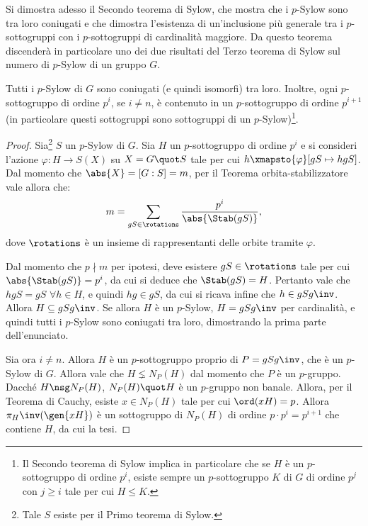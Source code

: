 \documentclass[12pt]{scrartcl}
\begin{document}
	Si dimostra adesso il Secondo teorema di Sylow, che mostra
	che i $p$-Sylow sono tra loro coniugati e che dimostra l'esistenza
	di un'inclusione più generale tra i $p$-sottogruppi con
	i $p$-sottogruppi di cardinalità maggiore. Da questo
	teorema discenderà in particolare uno dei due risultati
	del Terzo teorema di Sylow sul numero di $p$-Sylow di
	un gruppo $G$.

	\begin{theorem}
		Tutti i $p$-Sylow di $G$ sono coniugati (e quindi isomorfi)
		tra loro. Inoltre, ogni $p$-sottogruppo di ordine
		$p^i$, se $i \neq n$, è contenuto
		in un $p$-sottogruppo di ordine $p^{i+1}$ (in particolare
		questi sottogruppi sono sottogruppi di un $p$-Sylow)\footnote{
			Il Secondo teorema di Sylow implica in particolare
			che se $H$ è un $p$-sottogruppo di ordine $p^i$,
			esiste sempre un $p$-sottogruppo $K$ di $G$ di
			ordine $p^j$ con $j \geq i$ tale per cui
			$H \leq K$.
		}.
	\end{theorem}
	
	\begin{proof}
		Sia\footnote{
			Tale $S$ esiste per il Primo teorema di Sylow.
		} $S$ un $p$-Sylow di $G$. Sia $H$ un $p$-sottogruppo
		di ordine $p^i$ e si consideri l'azione
		$\varphi : H \to S(X)$ su $X = G \quot S$ tale per
		cui $h \xmapsto{\varphi} [gS \mapsto hgS]$. Dal momento
		che $\abs{X} = [G : S] = m$, per
		il Teorema orbita-stabilizzatore vale allora che:
		\[ m = \sum_{gS \in \rotations} \frac{p^i}{\abs{\Stab(gS)}}, \]
		dove $\rotations$ è un insieme di rappresentanti delle
		orbite tramite $\varphi$. \medskip
		
		
		Dal momento che $p \nmid m$ per ipotesi, deve esistere
		$gS \in \rotations$ tale per cui $\abs{\Stab(gS)} = p^i$,
		da cui si deduce che $\Stab(gS) = H$. Pertanto vale che
		$hgS = gS$ $\forall h \in H$, e quindi
		$hg \in gS$, da cui si ricava infine che $h \in gSg\inv$.
		Allora $H \subseteq gSg\inv$. Se allora $H$ è un $p$-Sylow,
		$H = gSg\inv$ per cardinalità, e quindi tutti i
		$p$-Sylow sono coniugati tra loro, dimostrando la prima
		parte dell'enunciato. \medskip
		
		
		Sia ora $i \neq n$. Allora $H$ è un $p$-sottogruppo proprio
		di $P = gSg\inv$, che è un $p$-Sylow di $G$. Allora
		vale che $H \lneq N_P(H)$ dal momento che $P$ è un $p$-gruppo.
		Dacché $H \nsg N_P(H)$, $N_P(H) \quot H$ è un $p$-gruppo
		non banale. Allora, per il Teorema di Cauchy, esiste
		$x \in N_P(H)$ tale per cui $\ord(xH) = p$. Allora
		$\pi_H\inv(\gen{xH})$ è un sottogruppo di $N_P(H)$ di ordine
		$p \cdot p^i = p^{i+1}$ che contiene $H$, da cui
		la tesi.
	\end{proof}
	
\end{document}
